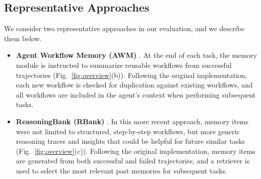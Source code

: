 \documentclass{article}
\begin{document}
\subsection{Representative Approaches}
\label{ssec:representative-approaches}
We consider two representative approaches in our evaluation, and we describe them below.

\begin{itemize}[leftmargin=2em, topsep=0pt, parsep=0pt]
    \item \textbf{Agent Workflow Memory (AWM)} \citep{wang2025agent}. 
    At the end of each task, the memory module is instructed to summarize reusable workflows from successful trajectories (Fig.~\ref{fig:overview}(b)). Following the original implementation, each new workflow is checked for duplication against existing workflows, and all workflows are included in the agent’s context when performing subsequent tasks.
    \item \textbf{ReasoningBank (RBank)} \citep{ouyang2025reasoningbankscalingagentselfevolving}. In this more recent approach, memory items were not limited to structured, step-by-step workflows, but more generic reasoning traces and insights that could be helpful for future similar tasks (Fig.~\ref{fig:overview}(c)). Following the original implementation, memory items are generated from both successful and failed trajectories, and a retriever is used to select the most relevant past memories for subsequent tasks.
\end{itemize}
\end{document}
